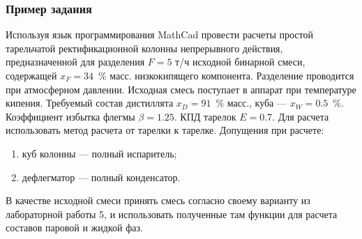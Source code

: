 \subsubsection{Пример задания}
Используя язык программирования MathCad провести расчеты простой тарельчатой ректификационной колонны непрерывного действия, предназначенной для разделения $F = 5$ т/ч исходной бинарной смеси, содержащей  $x_F = 34$~\% масс. низкокипящего компонента. Разделение проводится при атмосферном давлении. Исходная смесь поступает в аппарат при температуре кипения. Требуемый состав дистиллята $x_D = 91$~\% масс., куба --- $x_W = 0.5$~\%. Коэффициент избытка флегмы $\beta = 1.25$. КПД тарелок $E = 0.7$.
Для расчета использовать метод расчета от тарелки к тарелке. Допущения при расчете:
\begin{enumerate}
	\item куб колонны --- полный испаритель;
	\item дефлегматор --- полный конденсатор.
\end{enumerate}

В качестве исходной смеси принять смесь согласно своему варианту из лабораторной работы 5, и использовать полученные там функции для расчета составов паровой и жидкой фаз.


